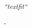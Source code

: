\documentclass[11pt, oneside]{Thesis} %
\begin{document}
\clearpage %


\pagestyle{empty} %

\null\vfill %

\textit{``textfit``}

\begin{flushright}
-
\end{flushright}

\vfill
\vfill
\vfill

\vfill
\vfill
\vfill
\vfill
\null %

\clearpage %


\end{document}

